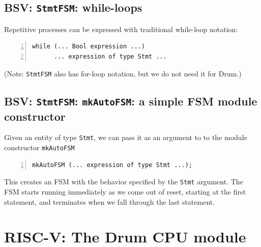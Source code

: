 
\subsection{BSV: {\tt StmtFSM}: while-loops}


Repetitive processes can be expressed with traditional while-loop notation:
\begin{Verbatim}[frame=single, numbers=left]
   while (... Bool expression ...)
      ... expression of type Stmt ...
\end{Verbatim}

(Note: \verb|StmtFSM| also has for-loop notation, but we do not need it for Drum.)


\subsection{BSV: {\tt StmtFSM}: {\tt mkAutoFSM}: a simple FSM module constructor}


Given an entity of type \verb|Stmt|, we can pass it as an argument to
to the module constructor \verb|mkAutoFSM|

\begin{Verbatim}[frame=single, numbers=left]
   mkAutoFSM (... expression of type Stmt ...);
\end{Verbatim}

This creates an FSM with the behavior specified by the \verb|Stmt|
argument.  The FSM starts running immediately as we come out of reset,
starting at the first statement, and terminates when we fall through
the last statement.


\section{RISC-V: The Drum CPU module}

\label{Sec_FSMs_Drum_CPU_module}


